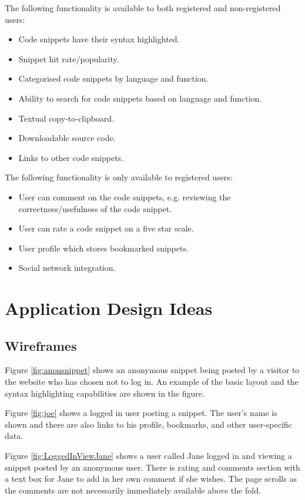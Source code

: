 \documentclass[11pt,a4paper]{article}
\begin{document}
The following functionality is available to both registered and
non-registered users:

\begin{itemize}
\item Code snippets have their syntax highlighted.
\item Snippet hit rate/popularity.
\item Categorised code snippets by language and function.
\item Ability to search for code snippets based on language and
function.
\item Textual copy-to-clipboard.
\item Downloadable source code.
\item Links to other code snippets.
\end{itemize}

The following functionality is only available to registered users:
\label{sec:restrict}

\begin{itemize}
\item User can comment on the code snippets, e.g. reviewing the
correctness/usefulness of the code snippet.
\item User can rate a code snippet on a five star scale.
\item User profile which stores bookmarked snippets.
\item Social network integration.
\end{itemize}

\newpage

\section{Application Design Ideas}

\subsection{Wireframes}

Figure \ref{fig:anonsnippet} shows an anonymous snippet being posted by a
visitor to the website who has chosen not to log in. An example of the basic
layout and the syntax highlighting capabilities are shown in the figure.

Figure \ref{fig:joe} shows a logged in user posting a snippet. The user's
name is shown and there are also links to his profile, bookmarks, and other
user-specific data.

Figure \ref{fig:LoggedInViewJane} shows a user called Jane logged in and viewing
a snippet posted by an anonymous user. There is rating and comments section
with a text box for Jane to add in her own comment if she wishes. The page
scrolls as the comments are not necessarily immediately available above the
fold.
\end{document}
